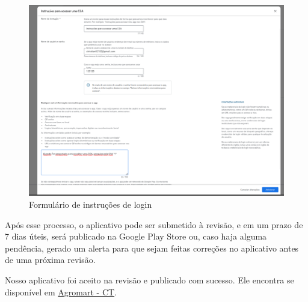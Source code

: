 \begin{figure}[h]
	\centering
\includegraphics[keepaspectratio=true,scale=0.35]{figuras/login-inst.png}
	\caption{Formulário de instruções de login}
	\label{login-inst}
\end{figure}

Após esse processo, o aplicativo pode ser submetido à revisão, e em um prazo de 7 dias úteis, será publicado na Google Play Store ou, caso haja alguma pendência, gerado um alerta para que sejam feitas correções no aplicativo antes de uma próxima revisão.

Nosso aplicativo foi aceito na revisão e publicado com sucesso. Ele encontra se disponível em \href{https://play.google.com/store/apps/details?id=com.ct.agromart}{Agromart - CT}.

